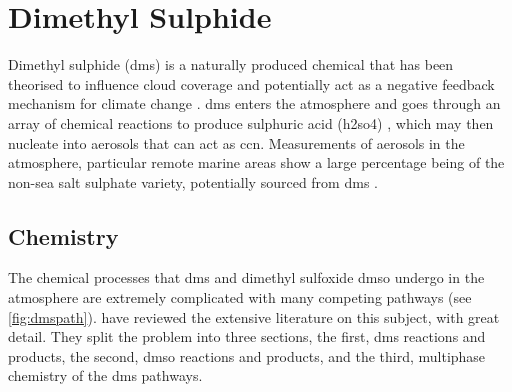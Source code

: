 





\chapter{Dimethyl Sulphide}
\label{ch:dms}

Dimethyl sulphide (\gls{dms}) is a naturally produced chemical that has been theorised to influence cloud coverage and potentially act as a negative feedback mechanism for climate change \citep{charlson:1987fw}. \gls{dms} enters the atmosphere and goes through an array of chemical reactions to produce sulphuric acid (\gls{h2so4}) \citep{barnes:2006ug}, which may then nucleate into aerosols that can act as \gls{ccn}. Measurements of aerosols in the atmosphere, particular remote marine areas show a large percentage being of the non-sea salt sulphate variety, potentially sourced from \gls{dms} \citep{o1997marine}.  


	\section{Chemistry}
	\label{sec:chem}

	The chemical processes that \gls{dms} and dimethyl sulfoxide \gls{dmso} undergo in the atmosphere are extremely complicated with many competing pathways (see \cref{fig:dmspath}). \citet{barnes:2006ug} have reviewed the extensive literature on this subject, with great detail. They split the problem into three sections, the first, \gls{dms} reactions and products, the second, \gls{dmso} reactions and products, and the third, multiphase chemistry of the \gls{dms} pathways.

